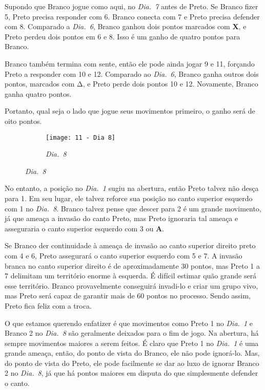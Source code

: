 Supondo que Branco jogue como aqui, no \emph{Dia.\@~7} antes de Preto. Se Branco fizer 5, Preto precisa responder com 6. Branco conecta com 7 e Preto precisa defender com 8. Comparado a \emph{Dia.\@~6}, Branco ganhou dois pontos marcados com \textbf{X}, e Preto perdeu dois pontos em 6 e 8. Isso é um ganho de quatro pontos para Branco.

Branco também termina com sente, então ele pode ainda jogar 9 e 11, forçando Preto a responder com 10 e 12. Comparado ao \emph{Dia.\@~6}, Branco ganha outros dois pontos, marcados com \(\increment\), e Preto perde dois pontos 10 e 12. Novamente, Branco ganha quatro pontos.

Portanto, qual seja o lado que jogue seus movimentos primeiro, o ganho será de oito pontos.

\begin{figure}[h!]
    \centering
    \begin{subfigure}[t]{.45\textwidth}
        \texttt{[image: 11 - Dia 8]}
        \caption*{\emph{Dia.\@~8}}
    \end{subfigure}
\end{figure}

No entanto, a posição no \emph{Dia.\@~1} sugiu na abertura, então Preto talvez não desça para 1. Em seu lugar, ele talvez reforce sua posição no canto superior esquerdo com 1 no \emph{Dia.\@~8}. Branco talvez pense que descer para 2 é um grande movimento, já que ameaça a invasão do canto Preto, mas Preto ignoraria  tal ameaça e asseguraria o canto superior esquerdo com 3 ou \textbf{A}.

Se Branco der continuidade à ameaça de invasão ao canto superior direito preto com 4 e 6, Preto assegurará o canto superior esquerdo com 5 e 7. A invasão branca no canto superior direito é de aproximadamente 30 pontos, mas Preto 1 a 7 delimitam um território enorme à esquerda. É difícil estimar quão grande será esse território. Branco provavelmente conseguirá invadi-lo e criar um grupo vivo, mas Preto será capaz de garantir mais de 60 pontos no processo. Sendo assim, Preto fica feliz com a troca.

O que estamos querendo enfatizer é que movimentos como Preto 1 no \emph{Dia.\@~1} e Branco 2 no \emph{Dia.\@~8} são geralmente deixados para o fim de jogo. Na abertura, há sempre movimentos maiores a serem feitos. É claro que Preto 1 no \emph{Dia.\@~1} é uma grande ameaça, então, do ponto de vista do Branco, ele não pode ignorá-lo. Mas, do ponto de vista do Preto, ele pode facilmente se dar ao luxo de ignorar Branco 2 no \emph{Dia.\@~8}, já que há pontos maiores em disputa do que simplesmente defender o canto.

